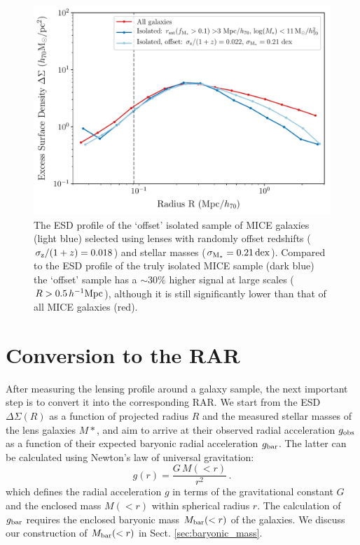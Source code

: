 \documentclass[usenatbib]{mnras}
\newcommand{\hMpc}{\, h^{-1}{\rm{Mpc}} }
\newcommand{\un}[1]{_{\rm #1}}
\newcommand{\dex}{\, {\rm dex}}
\begin{document}
\begin{figure}
	\includegraphics[width=1.0\columnwidth]{Figures/ESD_MICE_isotest_offset.pdf}
	\caption{The ESD profile of the `offset' isolated sample of MICE galaxies (light blue) selected using lenses with randomly offset redshifts ($\sigma\un{z}/(1+z) = 0.018$) and stellar masses ($\sigma\un{M_*} = 0.21 \dex$). Compared to the ESD profile of the truly isolated MICE sample (dark blue) the `offset' sample has a $\sim30\%$ higher signal at large scales ($R > 0.5 \hMpc$), although it is still significantly lower than that of all MICE galaxies (red).}
	\label{fig:isolation_test_offset}
\end{figure}


\section{Conversion to the RAR}
\label{sec:conversion}

After measuring the lensing profile around a galaxy sample, the next important step is to convert it into the corresponding RAR. We start from the ESD $\Delta\Sigma(R)$ as a function of projected radius $R$ and the measured stellar masses of the lens galaxies $M*$, and aim to arrive at their observed radial acceleration $g\un{obs}$ as a function of their expected baryonic radial acceleration $g\un{bar}$. The latter can be calculated using Newton's law of universal gravitation:
\begin{equation}\label{eq:grav}
g(r) = \frac{G \, M(<r)}{r^2} \, .
\end{equation}
which defines the radial acceleration $g$ in terms of the gravitational constant $G$ and the enclosed mass $M(<r)$ within spherical radius $r$. The calculation of  $g\un{bar}$ requires the enclosed baryonic mass $M\un{bar}(<r)$ of the galaxies. We discuss our construction of $M\un{bar}(<r)$ in Sect. \ref{sec:baryonic_mass}.
\end{document}
